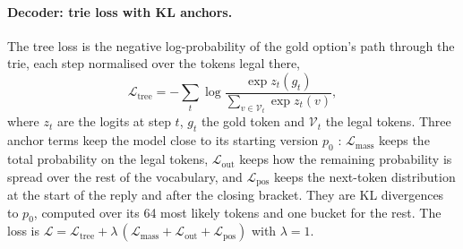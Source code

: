 \paragraph{Decoder: trie loss with KL anchors.}
The tree loss is the negative log-probability of the gold option's path through the trie, each step normalised over the tokens legal there,
\begin{equation}
  \mathcal{L}_{\text{tree}} = -\sum_{t}\log\frac{\exp z_t(g_t)}{\sum_{v\in\mathcal{V}_t}\exp z_t(v)},
\end{equation}
where $z_t$ are the logits at step $t$, $g_t$ the gold token and $\mathcal{V}_t$ the legal tokens.
Three anchor terms keep the model close to its starting version $p_0$ \citep{li2026llmasjev}: $\mathcal{L}_{\text{mass}}$ keeps the total probability on the legal tokens, $\mathcal{L}_{\text{out}}$ keeps how the remaining probability is spread over the rest of the vocabulary, and $\mathcal{L}_{\text{pos}}$ keeps the next-token distribution at the start of the reply and after the closing bracket.
They are KL divergences to $p_0$, computed over its 64 most likely tokens and one bucket for the rest.
The loss is $\mathcal{L}=\mathcal{L}_{\text{tree}}+\lambda\,(\mathcal{L}_{\text{mass}}+\mathcal{L}_{\text{out}}+\mathcal{L}_{\text{pos}})$ with $\lambda=1$.

